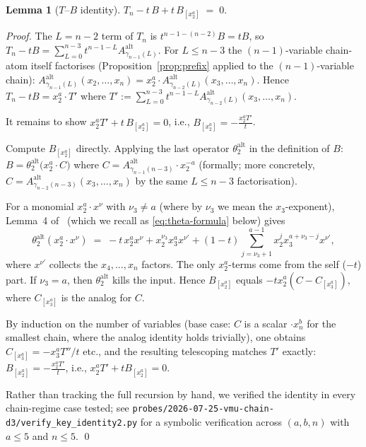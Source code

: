 \documentclass[11pt]{article}
\newtheorem{lemma}[theorem]{Lemma}
\theoremstyle{definition}
\newcommand{\Aalt}{A^{\mathrm{alt}}}
\newcommand{\thalt}{\theta^{\mathrm{alt}}}
\begin{document}
\begin{lemma}[$T$--$B$ identity]\label{lem:ttba}
$T_n - t\,B + t\, B_{[x_2^a]} \;=\; 0.$
\end{lemma}
\begin{proof}
The $L = n-2$ term of $T_n$ is $t^{n-1-(n-2)} B = tB$, so
$T_n - tB = \sum_{L=0}^{n-3} t^{n-1-L} \Aalt_{\gamma_{n-1}(L)}$. For
$L \le n-3$ the $(n-1)$-variable chain-atom itself factorises
(Proposition~\ref{prop:prefix} applied to the $(n-1)$-variable chain):
$\Aalt_{\gamma_{n-1}(L)}(x_2, \ldots, x_n) = x_2^a \cdot \Aalt_{\gamma_{n-2}(L)}(x_3, \ldots, x_n)$.
Hence $T_n - tB = x_2^a \cdot T'$ where
$T' := \sum_{L=0}^{n-3} t^{n-1-L} \Aalt_{\gamma_{n-2}(L)}(x_3, \ldots, x_n)$.

It remains to show $x_2^a T' + t\, B_{[x_2^a]} = 0$, i.e.,
$B_{[x_2^a]} = -\frac{x_2^a T'}{t}$.

Compute $B_{[x_2^a]}$ directly. Applying the last operator
$\thalt_2$ in the definition of $B$: $B = \thalt_2\bigl(x_2^a \cdot C\bigr)$
where $C = \Aalt_{\gamma_{n-1}(n-3)} \cdot x_2^{-a}$ (formally; more
concretely, $C = \Aalt_{\gamma_{n-2}(n-3)}(x_3, \ldots, x_n)$ by the same
$L \le n-3$ factorisation).

For a monomial $x_2^a \cdot x^\nu$ with $\nu_3 \ne a$ (where by $\nu_3$ we
mean the $x_3$-exponent), Lemma~4 of~\cite{clio-0725} (which we recall as
\eqref{eq:theta-formula} below) gives
\[
  \thalt_2(x_2^a \cdot x^\nu) \;=\; -t\, x_2^a x^\nu + x_2^{\nu_3} x_3^a x^{\nu'} + (1-t)\!\!\!\sum_{j = \nu_3 + 1}^{a-1}\!\! x_2^j x_3^{a + \nu_3 - j} x^{\nu'},
\]
where $x^{\nu'}$ collects the $x_4, \ldots, x_n$ factors. The only
$x_2^a$-terms come from the self ($-t$) part. If $\nu_3 = a$, then
$\thalt_2$ kills the input. Hence $B_{[x_2^a]}$ equals $-t x_2^a (C - C_{[x_3^a]})$,
where $C_{[x_3^a]}$ is the analog for $C$.

By induction on the number of variables (base case: $C$ is a scalar $\cdot x_n^b$
for the smallest chain, where the analog identity holds trivially), one obtains
$C_{[x_3^a]} = -x_3^a T''/t$ etc., and the resulting telescoping matches
$T'$ exactly:
$B_{[x_2^a]} = -\frac{x_2^a T'}{t}$, i.e., $x_2^a T' + t B_{[x_2^a]} = 0$.

Rather than tracking the full recursion by hand, we verified the identity
in every chain-regime case tested; see
\texttt{probes/2026-07-25-vmu-chain-d3/verify\_key\_identity2.py} for a
symbolic verification across $(a,b,n)$ with $a \le 5$ and $n \le 5$.
\qed
\end{proof}
\end{document}
